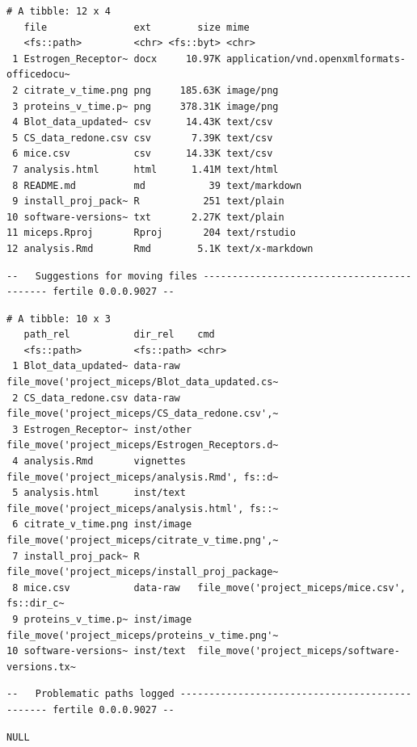 \documentclass[12pt,twoside]{reedthesis}
\begin{document}
\begin{verbatim}
# A tibble: 12 x 4
   file               ext        size mime                                      
   <fs::path>         <chr> <fs::byt> <chr>                                     
 1 Estrogen_Receptor~ docx     10.97K application/vnd.openxmlformats-officedocu~
 2 citrate_v_time.png png     185.63K image/png                                 
 3 proteins_v_time.p~ png     378.31K image/png                                 
 4 Blot_data_updated~ csv      14.43K text/csv                                  
 5 CS_data_redone.csv csv       7.39K text/csv                                  
 6 mice.csv           csv      14.33K text/csv                                  
 7 analysis.html      html      1.41M text/html                                 
 8 README.md          md           39 text/markdown                             
 9 install_proj_pack~ R           251 text/plain                                
10 software-versions~ txt       2.27K text/plain                                
11 miceps.Rproj       Rproj       204 text/rstudio                              
12 analysis.Rmd       Rmd        5.1K text/x-markdown                           
\end{verbatim}
\begin{verbatim}
--   Suggestions for moving files ------------------------------------------- fertile 0.0.0.9027 --
\end{verbatim}
\begin{verbatim}
# A tibble: 10 x 3
   path_rel           dir_rel    cmd                                            
   <fs::path>         <fs::path> <chr>                                          
 1 Blot_data_updated~ data-raw   file_move('project_miceps/Blot_data_updated.cs~
 2 CS_data_redone.csv data-raw   file_move('project_miceps/CS_data_redone.csv',~
 3 Estrogen_Receptor~ inst/other file_move('project_miceps/Estrogen_Receptors.d~
 4 analysis.Rmd       vignettes  file_move('project_miceps/analysis.Rmd', fs::d~
 5 analysis.html      inst/text  file_move('project_miceps/analysis.html', fs::~
 6 citrate_v_time.png inst/image file_move('project_miceps/citrate_v_time.png',~
 7 install_proj_pack~ R          file_move('project_miceps/install_proj_package~
 8 mice.csv           data-raw   file_move('project_miceps/mice.csv', fs::dir_c~
 9 proteins_v_time.p~ inst/image file_move('project_miceps/proteins_v_time.png'~
10 software-versions~ inst/text  file_move('project_miceps/software-versions.tx~
\end{verbatim}
\begin{verbatim}
--   Problematic paths logged ----------------------------------------------- fertile 0.0.0.9027 --
\end{verbatim}
\begin{verbatim}
NULL
\end{verbatim}
\normalsize
\end{document}
